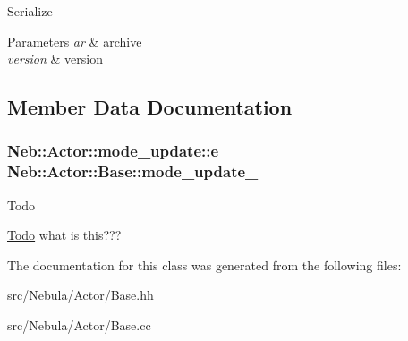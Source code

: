 Serialize 


\begin{DoxyParams}{Parameters}
{\em ar} & archive \\
\hline
{\em version} & version \\
\hline
\end{DoxyParams}


\subsection{Member Data Documentation}
\hypertarget{classNeb_1_1Actor_1_1Base_ad51160f955b8bff638c938360ff3ce00}{
\subsubsection[{mode\-\_\-update\-\_\-}]{\setlength{\rightskip}{0pt plus 5cm}Neb\-::\-Actor\-::mode\-\_\-update\-::e Neb\-::\-Actor\-::\-Base\-::mode\-\_\-update\-\_\-}}\label{classNeb_1_1Actor_1_1Base_ad51160f955b8bff638c938360ff3ce00}
\begin{DoxyRefDesc}{Todo}
\item[\hyperlink{todo__todo000002}{Todo}]what is this??? \end{DoxyRefDesc}


The documentation for this class was generated from the following files\-:\begin{DoxyCompactItemize}
\item 
src/\-Nebula/\-Actor/Base.\-hh\item 
src/\-Nebula/\-Actor/Base.\-cc\end{DoxyCompactItemize}
